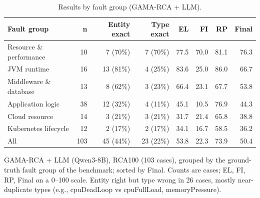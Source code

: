 \begin{table}[t]
\centering\small
\caption{Results by fault group (GAMA-RCA + LLM).}\label{tab:groups}
\begin{tabular}{lrrrrrrr}
\toprule
Fault group & n & Entity exact & Type exact & EL & FI & RP & Final \\
\midrule
Resource \& performance & 10 & 7 (70\%) & 7 (70\%) & 77.5 & 70.0 & 81.1 & 76.3 \\
JVM runtime & 16 & 13 (81\%) & 4 (25\%) & 83.6 & 25.0 & 86.0 & 66.7 \\
Middleware \& database & 13 & 8 (62\%) & 3 (23\%) & 66.4 & 23.1 & 67.7 & 53.8 \\
Application logic & 38 & 12 (32\%) & 4 (11\%) & 45.1 & 10.5 & 76.9 & 44.3 \\
Cloud resource & 14 & 3 (21\%) & 3 (21\%) & 31.7 & 21.4 & 65.8 & 38.8 \\
Kubernetes lifecycle & 12 & 2 (17\%) & 2 (17\%) & 34.1 & 16.7 & 58.5 & 36.2 \\
All & 103 & 45 (44\%) & 23 (22\%) & 53.8 & 22.3 & 73.9 & 50.4 \\
\bottomrule
\end{tabular}
\par\smallskip\footnotesize GAMA-RCA + LLM (Qwen3-8B), RCA100 (103 cases), grouped by the ground-truth fault group of the benchmark; sorted by Final. Counts are cases; EL, FI, RP, Final on a 0--100 scale. Entity right but type wrong in 26 cases, mostly near-duplicate types (e.g., cpuDeadLoop vs cpuFullLoad, memoryPressure).
\end{table}